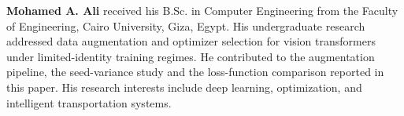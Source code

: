 \medskip\noindent\textbf{Mohamed A. Ali} received his B.Sc. in Computer
Engineering from the Faculty of Engineering, Cairo University, Giza, Egypt. His
undergraduate research addressed data augmentation and optimizer selection for
vision transformers under limited-identity training regimes. He contributed to
the augmentation pipeline, the seed-variance study and the loss-function
comparison reported in this paper. His research interests include deep
learning, optimization, and intelligent transportation systems.
